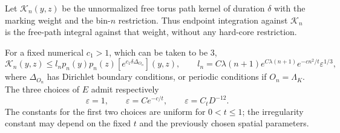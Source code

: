 Let $\mathcal K_n(y,z)$ be the unnormalized free torus
path kernel of duration $\delta$ with the marking weight
and the bin-$n$ restriction.  Thus endpoint integration
against $\mathcal K_n$ is the free-path integral against
that weight, without any hard-core restriction.

\begin{lemma}\label{lem:marked-kernel}
For a fixed numerical $c_1>1$, which can be taken to be $3$,
\begin{equation}\label{eq:marked-kernel}
 \mathcal K_n(y,z)\le l_n p_n(y)p_n(z)
       [e^{c_1\delta\Delta_{O_n}}](y,z),
 \qquad
 l_n=C\lambda(n+1)e^{C\lambda(n+1)}
       e^{-cn^2/t}\varepsilon^{1/3},
\end{equation}
where $\Delta_{O_n}$ has Dirichlet boundary conditions, or
periodic conditions if $O_n=\Lambda_K$.  The three choices
of $E$ admit respectively
\begin{equation}\label{eq:path-epsilon}
 \varepsilon=1,\qquad
 \varepsilon=Ce^{-c/t},\qquad
 \varepsilon=C_tD^{-12}.
\end{equation}
The constants for the first two choices are uniform for
$0<t\le1$; the irregularity constant may depend on the
fixed $t$ and the previously chosen spatial parameters.
\end{lemma}

